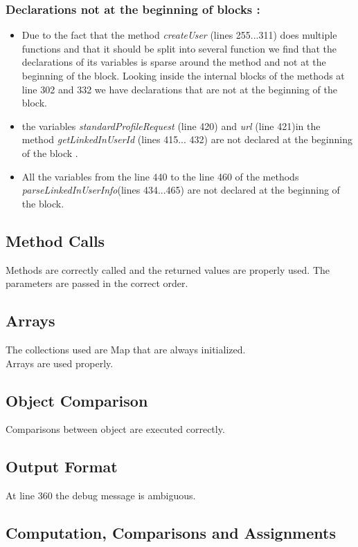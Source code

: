 \subsubsection{Declarations not at the beginning of blocks :}
\begin{itemize}
\item Due to the fact that the method  \textit{createUser} (lines   255...311) does multiple functions and that it should be split into several function we find that the declarations of its variables is sparse around the method and not at the beginning of the block. Looking inside the internal blocks of the methods  at line 302 and 332 we have declarations that are not at the beginning of the block.
\item the variables \textit{standardProfileRequest} (line 420) and \textit{url} (line 421)in the method \textit{getLinkedInUserId} (lines 415... 432) are not declared at the beginning of the block .
\item All the variables from the line 440 to the line 460 of the methods \textit{parseLinkedInUserInfo}(lines 434...465) are  not declared at the beginning of the block.
\end{itemize}

\subsection{Method Calls}
Methods are correctly called and the returned values are properly used.
The parameters are passed in the correct order.

\subsection{Arrays}
The collections used are Map that are always initialized. \\
Arrays are used properly.

\subsection{Object Comparison}
Comparisons between object are executed correctly.

\subsection{Output Format}
At line 360 the debug message is ambiguous.

\subsection{Computation, Comparisons and Assignments}
